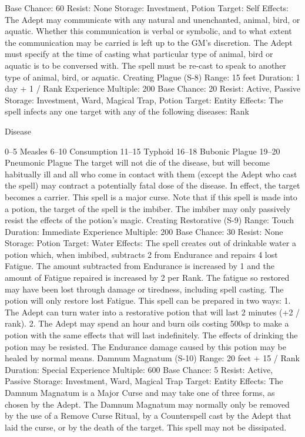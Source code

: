 \documentclass[a4paper]{article}
\begin{document}
\begin{multicols}{3}
Base Chance: 60%
Resist: None
Storage: Investment, Potion
Target: Self
Effects: The Adept may communicate with any
natural and unenchanted, animal, bird, or aquatic.
Whether this communication is verbal or symbolic,
and to what extent the communication may be
carried is left up to the GM’s discretion. The Adept
must specify at the time of casting what particular
type of animal, bird or aquatic is to be conversed
with. The spell must be re-cast to speak to another
type of animal, bird, or aquatic.
Creating Plague (S-8)
Range: 15 feet
Duration: 1 day + 1 / Rank
Experience Multiple: 200
Base Chance: 20%
Resist: Active, Passive
Storage: Investment, Ward, Magical Trap, Potion
Target: Entity
Effects: The spell infects any one target with any of
the following diseases:
Rank

Disease

0–5
Measles
6–10
Consumption
11–15 Typhoid
16–18 Bubonic Plague
19–20 Pneumonic Plague
The target will not die of the disease, but will become habitually ill and all who come in contact
with them (except the Adept who cast the spell)
may contract a potentially fatal dose of the disease.
In effect, the target becomes a carrier. This spell is
a major curse. Note that if this spell is made into a
potion, the target of the spell is the imbiber. The
imbiber may only passively resist the effects of the
potion’s magic.
Creating Restorative (S-9)
Range: Touch
Duration: Immediate
Experience Multiple: 200
Base Chance: 30%
Resist: None
Storage: Potion
Target: Water
Effects: The spell creates out of drinkable water a
potion which, when imbibed, subtracts 2 from
Endurance and repairs
4 lost Fatigue. The amount subtracted from Endurance is increased by 1 and the amount of Fatigue
repaired is increased by 2 per Rank. The fatigue so
restored may have been lost through damage or
tiredness, including spell casting. The potion will
only restore lost Fatigue. This spell can be prepared in two ways:
1. The Adept can turn water into a restorative
potion that will last 2 minutes (+2 / rank).
2. The Adept may spend an hour and burn oils
costing 500sp to make a potion with the same
effects that will last indefinitely.
The effects of drinking the potion may be resisted.
The Endurance damage caused by this potion may
be healed by normal means.
Damnum Magnatum (S-10)
Range: 20 feet + 15 / Rank
Duration: Special
Experience Multiple: 600
Base Chance: 5%
Resist: Active, Passive
Storage: Investment, Ward, Magical Trap
Target: Entity
Effects: The Damnum Magnatum is a Major Curse
and may take one of three forms, as chosen by the
Adept. The Damnum Magnatum may normally
only be removed by the use of a Remove Curse
Ritual, by a Counterspell cast by the Adept that
laid the curse, or by the death of the target. This
spell may not be dissipated.


\end{multicols}
\end{document}
